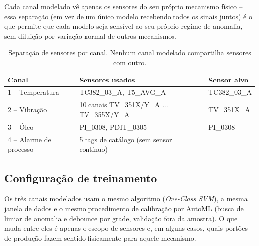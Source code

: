 \documentclass[11pt,a4paper]{article}
\begin{document}
Cada canal modelado vê apenas os sensores do seu próprio mecanismo
físico -- essa separação (em vez de um único modelo recebendo todos
os sinais juntos) é o que permite que cada modelo seja sensível ao
seu próprio regime de anomalia, sem diluição por variação normal de
outros mecanismos.

\begin{table}[H]
\centering
\begin{tabular}{lll}
\toprule
\textbf{Canal} & \textbf{Sensores usados} & \textbf{Sensor alvo} \\
\midrule
1 -- Temperatura & TC382\_03\_A, T5\_AVG\_A & TC382\_03\_A \\
2 -- Vibração & 10 canais TV\_351X/Y\_A ... TV\_355X/Y\_A & TV\_351X\_A \\
3 -- Óleo & PI\_0308, PDIT\_0305 & PI\_0308 \\
4 -- Alarme de processo & 5 tags de catálogo (sem sensor contínuo) & -- \\
\bottomrule
\end{tabular}
\caption{Separação de sensores por canal. Nenhum canal modelado
compartilha sensores com outro.}
\end{table}

\subsection{Configuração de treinamento}

Os três canais modelados usam o mesmo algoritmo (\textit{One-Class
SVM}), a mesma janela de dados e o mesmo procedimento de calibração
por AutoML (busca de limiar de anomalia e debounce por grade,
validação fora da amostra). O que muda entre eles é apenas o escopo
de sensores e, em alguns casos, quais portões de produção fazem
sentido fisicamente para aquele mecanismo.
\end{document}

